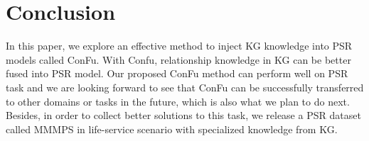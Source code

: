 \section{Conclusion}
In this paper, we explore an effective method to inject KG knowledge into PSR models called ConFu. With Confu, relationship knowledge in KG can be better fused into PSR model. Our proposed ConFu method can perform well on PSR task and we are looking forward to see that ConFu can be successfully transferred to other domains or tasks in the future, which is also what we plan to do next. Besides, in order to collect better solutions to this task, we release a PSR dataset called MMMPS in life-service scenario with specialized knowledge from KG.

